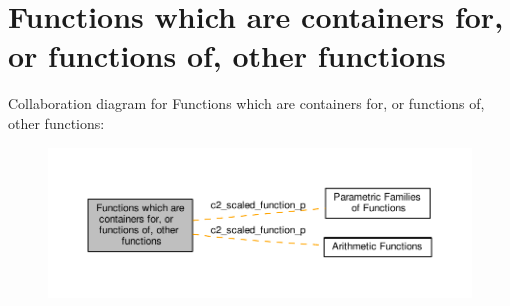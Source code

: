 \hypertarget{group__containers}{}\section{Functions which are containers for, or functions of, other functions}
\label{group__containers}
Collaboration diagram for Functions which are containers for, or functions of, other functions\+:
\nopagebreak
\begin{figure}[H]
\begin{center}
\leavevmode
\includegraphics[width=350pt]{group__containers}
\end{center}
\end{figure}
